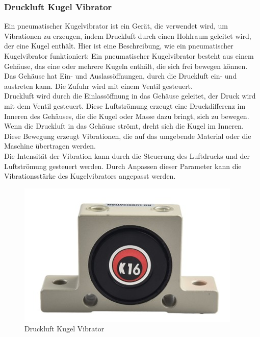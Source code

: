 \subsubsection{Druckluft Kugel Vibrator}
Ein pneumatischer Kugelvibrator ist ein Gerät, die verwendet wird, um Vibrationen zu erzeugen, indem Druckluft durch einen Hohlraum geleitet wird, der eine Kugel enthält. Hier ist eine Beschreibung, wie ein pneumatischer Kugelvibrator funktioniert:
Ein pneumatischer Kugelvibrator besteht aus einem Gehäuse, das eine oder mehrere Kugeln enthält, die sich frei bewegen können. Das Gehäuse hat Ein- und Auslassöffnungen, durch die Druckluft ein- und austreten kann. Die Zufuhr wird mit einem Ventil gesteuert.\\
Druckluft wird durch die Einlassöffnung in das Gehäuse geleitet, der Druck wird mit dem Ventil gesteuert. Diese Luftströmung erzeugt eine Druckdifferenz im Inneren des Gehäuses, die die Kugel oder Masse dazu bringt, sich zu bewegen.\\
\vspace{3mm}
Wenn die Druckluft in das Gehäuse strömt, dreht sich die Kugel im Inneren. Diese Bewegung erzeugt Vibrationen, die auf das umgebende Material oder die Maschine übertragen werden.\\
\vspace{3mm}
Die Intensität der Vibration kann durch die Steuerung des Luftdrucks und der Luftströmung gesteuert werden. Durch Anpassen dieser Parameter kann die Vibrationsstärke des Kugelvibrators angepasst werden.\\
\vspace{3mm}
\begin{figure}[H]
    \centering
    \includegraphics{image/vibration.jpeg}
    \caption{Druckluft Kugel Vibrator\autocite{PneumatischerVibrator}}
    \label{fig:enter-label}
\end{figure}
